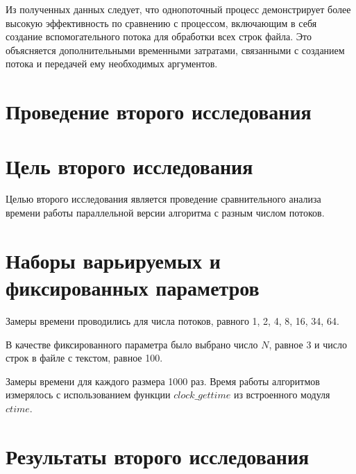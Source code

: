 Из полученных данных следует, что однопоточный процесс демонстрирует более высокую эффективность по сравнению с процессом, включающим в себя создание вспомогательного потока для обработки всех строк файла. Это объясняется дополнительными временными затратами, связанными с созданием потока и передачей ему необходимых аргументов.

\clearpage

\section{Проведение второго исследования}

\section*{Цель второго исследования}

Целью второго исследования является проведение сравнительного анализа времени работы параллельной версии алгоритма с разным числом потоков.

\section*{Наборы варьируемых и фиксированных параметров}

Замеры времени проводились для числа потоков, равного 1, 2, 4, 8, 16, 34, 64.

В качестве фиксированного параметра было выбрано число $N$, равное 3 и число строк в файле с текстом, равное 100.

Замеры времени для каждого размера 1000 раз. Время работы алгоритмов измерялось с использованием функции $clock\_gettime$ из встроенного модуля $ctime$.  

\section*{Результаты второго исследования}

